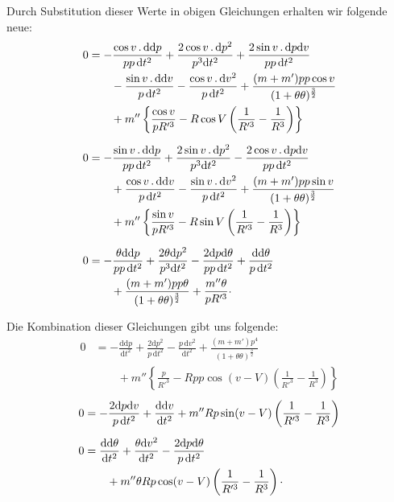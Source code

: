 \par\noindent\hspace*{\parindent}Durch Substitution dieser Werte in obigen Gleichungen erhalten wir
folgende neue:
\[
\begin{aligned}
0&=-\frac{\cos v\, .\,\mathrm{dd}p}{pp\,\mathrm{d}t^2}
  +\frac{2\cos v\, .\,\mathrm{d}p^2}{p^3\mathrm{d}t^2}
  +\frac{2\sin v\, .\,\mathrm{d}p\mathrm{d}v}{pp\,\mathrm{d}t^2}\\
 &\qquad-\frac{\sin v\, .\,\mathrm{dd}v}{p\,\mathrm{d}t^2}
  -\frac{\cos v\, .\,\mathrm{d}v^2}{p\,\mathrm{d}t^2}
  +\frac{(m+m')pp\cos v}{(1+\theta\theta)^{\frac{3}{2}}}\\
 &\qquad+m''\left\{\frac{\cos v}{pR'^3}
  -R\cos V\left(\frac{1}{R'^3}-\frac{1}{R^3}\right)\right\}\\[6pt]
0&=-\frac{\sin v\, .\,\mathrm{dd}p}{pp\,\mathrm{d}t^2}
  +\frac{2\sin v\, .\,\mathrm{d}p^2}{p^3\mathrm{d}t^2}
  -\frac{2\cos v\, .\,\mathrm{d}p\mathrm{d}v}{pp\,\mathrm{d}t^2}\\
 &\qquad+\frac{\cos v\, .\,\mathrm{dd}v}{p\,\mathrm{d}t^2}
  -\frac{\sin v\, .\,\mathrm{d}v^2}{p\,\mathrm{d}t^2}
  +\frac{(m+m')pp\sin v}{(1+\theta\theta)^{\frac{3}{2}}}\\
 &\qquad+m''\left\{\frac{\sin v}{pR'^3}
  -R\sin V\left(\frac{1}{R'^3}-\frac{1}{R^3}\right)\right\}\\[6pt]
0&=-\frac{\theta\mathrm{dd}p}{pp\,\mathrm{d}t^2}
  +\frac{2\theta\mathrm{d}p^2}{p^3\mathrm{d}t^2}
  -\frac{2\mathrm{d}p\mathrm{d}\theta}{pp\,\mathrm{d}t^2}
  +\frac{\mathrm{dd}\theta}{p\,\mathrm{d}t^2}\\
 &\qquad+\frac{(m+m')pp\theta}{(1+\theta\theta)^{\frac{3}{2}}}
  +\frac{m''\theta}{pR'^3}\mathpunct{\raisebox{.4ex}{.}}
\end{aligned}
\]

\par\noindent\hspace*{\parindent}Die Kombination dieser Gleichungen gibt uns folgende:
\[
\begin{aligned}
0&=-\frac{\mathrm{dd}p}{\mathrm{d}t^2}
  +\frac{2\mathrm{d}p^2}{p\,\mathrm{d}t^2}
  -\frac{p\,\mathrm{d}v^2}{\mathrm{d}t^2}
  +\frac{(m+m')p^4}{(1+\theta\theta)^{\frac{3}{2}}}\\
 &\qquad+m''\left\{\frac{p}{R'^3}
  -Rpp\cos(v-V)\left(\frac{1}{R'^3}-\frac{1}{R^3}\right)\right\}
\end{aligned}
\]
\[
\begin{aligned}
0&=-\frac{2\mathrm{d}p\mathrm{d}v}{p\,\mathrm{d}t^2}
  +\frac{\mathrm{dd}v}{\mathrm{d}t^2}
  +m''Rp\sin(v-V)\left(\frac{1}{R'^3}-\frac{1}{R^3}\right)\\[5pt]
0&=\frac{\mathrm{dd}\theta}{\mathrm{d}t^2}
  +\frac{\theta\mathrm{d}v^2}{\mathrm{d}t^2}
  -\frac{2\mathrm{d}p\mathrm{d}\theta}{p\,\mathrm{d}t^2}\\
 &\qquad+m''\theta Rp\cos(v-V)\left(\frac{1}{R'^3}-\frac{1}{R^3}\right)
  \mathpunct{\raisebox{.4ex}{.}}
\end{aligned}
\]

